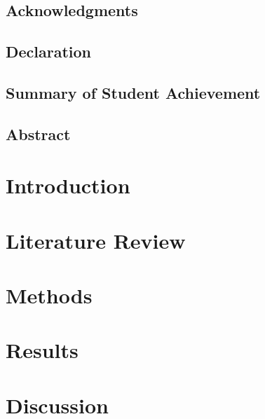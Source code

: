 \documentclass[12pt]{report}
\begin{document}

\restoregeometry

\section*{Acknowledgments}

\pagebreak

\section*{Declaration}

\pagebreak

\section*{Summary of Student Achievement}

\pagebreak

\setcounter{tocdepth}{5}
\tableofcontents
\pagebreak

\listoffigures
\listoftables
\pagebreak

\justify

\section*{Abstract}

\pagebreak
\printglossary

\chapter{Introduction}


\chapter{Literature Review}


\chapter{Methods}


\chapter{Results}


\chapter{Discussion}

\end{document}
